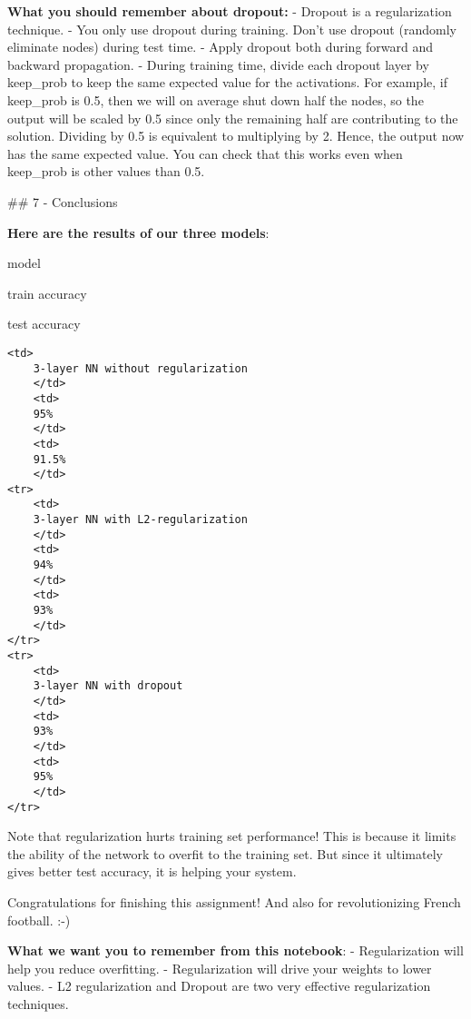 \documentclass[11pt]{article}
\begin{document}
\textbf{What you should remember about dropout:} - Dropout is a
regularization technique. - You only use dropout during training. Don't
use dropout (randomly eliminate nodes) during test time. - Apply dropout
both during forward and backward propagation. - During training time,
divide each dropout layer by keep\_prob to keep the same expected value
for the activations. For example, if keep\_prob is 0.5, then we will on
average shut down half the nodes, so the output will be scaled by 0.5
since only the remaining half are contributing to the solution. Dividing
by 0.5 is equivalent to multiplying by 2. Hence, the output now has the
same expected value. You can check that this works even when keep\_prob
is other values than 0.5.

    \#\# 7 - Conclusions

    \textbf{Here are the results of our three models}:

model

train accuracy

test accuracy

\begin{verbatim}
<td>
    3-layer NN without regularization
    </td>
    <td>
    95%
    </td>
    <td>
    91.5%
    </td>
<tr>
    <td>
    3-layer NN with L2-regularization
    </td>
    <td>
    94%
    </td>
    <td>
    93%
    </td>
</tr>
<tr>
    <td>
    3-layer NN with dropout
    </td>
    <td>
    93%
    </td>
    <td>
    95%
    </td>
</tr>
\end{verbatim}

    Note that regularization hurts training set performance! This is because
it limits the ability of the network to overfit to the training set. But
since it ultimately gives better test accuracy, it is helping your
system.

    Congratulations for finishing this assignment! And also for
revolutionizing French football. :-)

    \textbf{What we want you to remember from this notebook}: -
Regularization will help you reduce overfitting. - Regularization will
drive your weights to lower values. - L2 regularization and Dropout are
two very effective regularization techniques.


    
    
    
\end{document}
